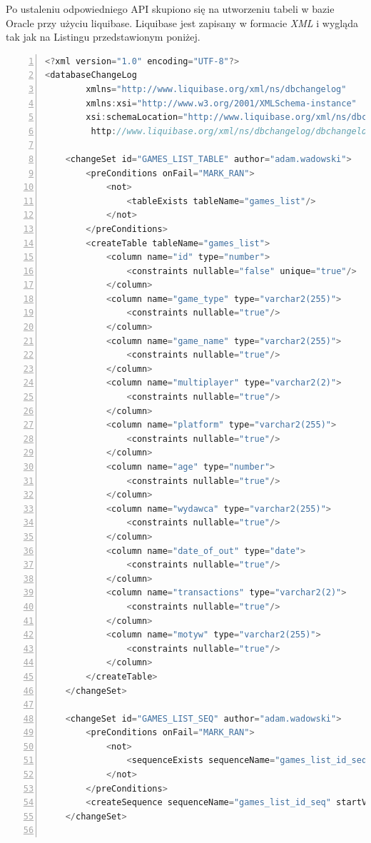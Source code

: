 Po ustaleniu odpowiedniego API skupiono się na utworzeniu tabeli w bazie Oracle przy użyciu liquibase. Liquibase jest zapisany w formacie \textit{XML} i wygląda tak jak na Listingu przedstawionym poniżej.
\begin{lstlisting}[language=C, mathescape, frame=single, numbers=left, xleftmargin=2em, framexleftmargin=2em, basicstyle=\ttfamily\bfseries, caption={Tworzenie tabeli przy użyciu Liquibase}, label={Tworzenie tabeli przy użyciu Liquibase}]
<?xml version="1.0" encoding="UTF-8"?>
<databaseChangeLog
        xmlns="http://www.liquibase.org/xml/ns/dbchangelog"
        xmlns:xsi="http://www.w3.org/2001/XMLSchema-instance"
        xsi:schemaLocation="http://www.liquibase.org/xml/ns/dbchangelog
         http://www.liquibase.org/xml/ns/dbchangelog/dbchangelog-3.8.xsd">

    <changeSet id="GAMES_LIST_TABLE" author="adam.wadowski">
        <preConditions onFail="MARK_RAN">
            <not>
                <tableExists tableName="games_list"/>
            </not>
        </preConditions>
        <createTable tableName="games_list">
            <column name="id" type="number">
                <constraints nullable="false" unique="true"/>
            </column>
            <column name="game_type" type="varchar2(255)">
                <constraints nullable="true"/>
            </column>
            <column name="game_name" type="varchar2(255)">
                <constraints nullable="true"/>
            </column>
            <column name="multiplayer" type="varchar2(2)">
                <constraints nullable="true"/>
            </column>
            <column name="platform" type="varchar2(255)">
                <constraints nullable="true"/>
            </column>
            <column name="age" type="number">
                <constraints nullable="true"/>
            </column>
            <column name="wydawca" type="varchar2(255)">
                <constraints nullable="true"/>
            </column>
            <column name="date_of_out" type="date">
                <constraints nullable="true"/>
            </column>
            <column name="transactions" type="varchar2(2)">
                <constraints nullable="true"/>
            </column>
            <column name="motyw" type="varchar2(255)">
                <constraints nullable="true"/>
            </column>
        </createTable>
    </changeSet>

    <changeSet id="GAMES_LIST_SEQ" author="adam.wadowski">
        <preConditions onFail="MARK_RAN">
            <not>
                <sequenceExists sequenceName="games_list_id_seq"/>
            </not>
        </preConditions>
        <createSequence sequenceName="games_list_id_seq" startValue="1"/>
    </changeSet>


\end{lstlisting}
